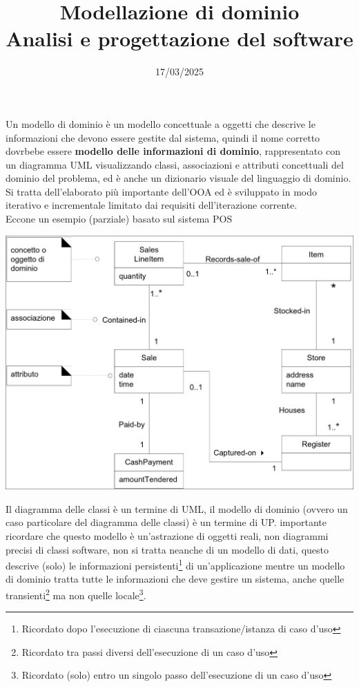 \documentclass{article}
\title{Modellazione di dominio\\\normalsize Analisi e progettazione del software}
\date{17/03/2025}
\begin{document}
\maketitle
Un modello di dominio è un modello concettuale a oggetti che descrive le informazioni che devono essere gestite dal sistema, quindi il nome corretto dovrbebe essere \textbf{modello delle informazioni di dominio}, rappresentato con un diagramma UML visualizzando classi, associazioni e attributi concettuali del dominio del problema, ed è anche un dizionario visuale del linguaggio di dominio.\acapo
Si tratta dell'elaborato più importante dell'OOA ed è sviluppato in modo iterativo e incrementale limitato dai requisiti dell'iterazione corrente.\\
Eccone un esempio (parziale) basato sul sistema POS
\begin{center}
    \includegraphics[width=\textwidth]{images/modello di dominio parziale pos.png}
\end{center}
Il diagramma delle classi è un termine di UML, il modello di dominio (ovvero un caso particolare del diagramma delle classi) è un termine di UP. \Eaccentata importante ricordare che questo modello è un'astrazione di oggetti reali, non diagrammi precisi di classi software, non si tratta neanche di un modello di dati, questo descrive (solo) le informazioni persistenti\footnote{Ricordato dopo l'esecuzione di ciascuna transazione/istanza di caso d'uso} di un'applicazione mentre un modello di dominio tratta tutte le informazioni che deve gestire un sistema, anche quelle transienti\footnote{Ricordato tra passi diversi dell'esecuzione di un caso d'uso} ma non quelle \vopen locale\vclosespace\footnote{Ricordato (solo) entro un singolo passo dell'esecuzione di un caso d'uso}.\acapo
\end{document}
